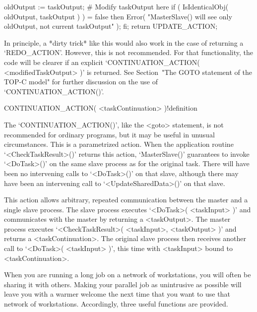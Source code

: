 \begintt
oldOutput := taskOutput;
# Modify taskOutput here
if ( IsIdenticalObj( oldOutput, taskOutput ) ) = false then
  Error( "MasterSlave() will see only oldOutput, not current taskOutput" );
fi;
return UPDATE_ACTION;
\endtt

In principle, a *dirty trick* like this would also work in  the  case  of
returning a `REDO_ACTION'. However, this is  not  recommended.  For  that
functionality,   the   code   will   be   clearer    if    an    explicit
`CONTINUATION_ACTION(   <modifiedTaskOutput>   )'   is   returned.    See
Section~"The GOTO statement of the TOP-C model" for further discussion on
the use of `CONTINUATION_ACTION()'.


\>CONTINUATION_ACTION( <taskContinuation> )!{definition}

The  `CONTINUATION_ACTION()',  like  the   <goto>   statement,   is   not
recommended for ordinary programs,  but  it  may  be  useful  in  unusual
circumstances. This  is  a  parametrized  action.  When  the  application
routine  `<CheckTaskResult>()'   returns   this   action,   `MasterSlave()'
guarantees to invoke `<DoTask>()' on the same slave process  as  for  the
original task. There will have been no intervening calls to  `<DoTask>()'
on that slave, although there  may  have  been  an  intervening  call  to
`<UpdateSharedData>()' on that slave.

This action allows arbitrary, repeated communication between  the  master
and a  single  slave  process.  The  slave  process  executes  `<DoTask>(
<taskInput>  )'  and  communicates  with  the  master  by   returning   a
<taskOutput>.   The   master   process    executes    `<CheckTaskResult>(
<taskInput>,  <taskOutput>  )'  and  returns  a  <taskContinuation>.  The
original  slave  process  then  receives  another  call   to   `<DoTask>(
<taskInput> )', this time with <taskInput> bound to <taskContinuation>.


When you are running a long job on a network of  workstations,  you  will
often be sharing it with others. Making your parallel job as  unintrusive
as possible will leave you with a warmer welcome the next time  that  you
want to use that  network  of  workstations.  Accordingly,  three  useful
functions are provided.

